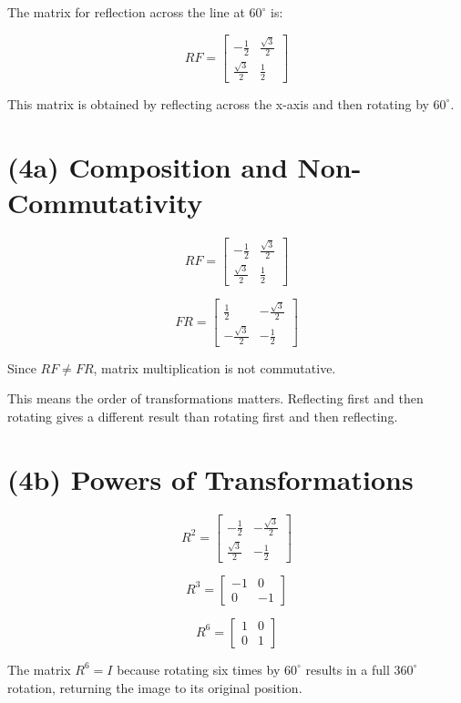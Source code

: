 \documentclass{ximera}
\begin{document}
The matrix for reflection across the line at $60^\circ$ is:

\[
RF =
\begin{bmatrix}
-\frac{1}{2} & \frac{\sqrt{3}}{2} \\
\frac{\sqrt{3}}{2} & \frac{1}{2}
\end{bmatrix}
\]

This matrix is obtained by reflecting across the x-axis and then rotating by $60^\circ$.

\section*{(4a) Composition and Non-Commutativity}

\[
RF =
\begin{bmatrix}
-\frac{1}{2} & \frac{\sqrt{3}}{2} \\
\frac{\sqrt{3}}{2} & \frac{1}{2}
\end{bmatrix}
\]

\[
FR =
\begin{bmatrix}
\frac{1}{2} & -\frac{\sqrt{3}}{2} \\
-\frac{\sqrt{3}}{2} & -\frac{1}{2}
\end{bmatrix}
\]

Since $RF \neq FR$, matrix multiplication is not commutative.

This means the order of transformations matters. Reflecting first and then rotating gives a different result than rotating first and then reflecting.

\section*{(4b) Powers of Transformations}

\[
R^2 =
\begin{bmatrix}
-\frac{1}{2} & -\frac{\sqrt{3}}{2} \\
\frac{\sqrt{3}}{2} & -\frac{1}{2}
\end{bmatrix}
\]

\[
R^3 =
\begin{bmatrix}
-1 & 0 \\
0 & -1
\end{bmatrix}
\]

\[
R^6 =
\begin{bmatrix}
1 & 0 \\
0 & 1
\end{bmatrix}
\]

The matrix $R^6 = I$ because rotating six times by $60^\circ$ results in a full $360^\circ$ rotation, returning the image to its original position.
\end{document}
